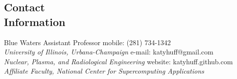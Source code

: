 \documentclass[margin,line]{resume}
\begin{document}
\begin{resume}

    \section{\mysidestyle Contact\\Information}
    Blue Waters Assistant Professor \hfill mobile: (281) 734-1342 \vspace{0mm}\\\vspace{0mm}%
        \textsl{University of Illinois, Urbana-Champaign}
        \hfill e-mail: katyhuff@gmail.com            \vspace{0mm}\\\vspace{0mm}%
    \textsl{Nuclear, Plasma, and Radiological Engineering}
        \hfill website: katyhuff.github.com     \vspace{0mm}\\\vspace{-4.5mm}%
    \textsl{Affiliate Faculty, National Center for Supercomputing Applications}           \vspace{0mm}\\\vspace{0mm}%


\end{resume}
\end{document}
